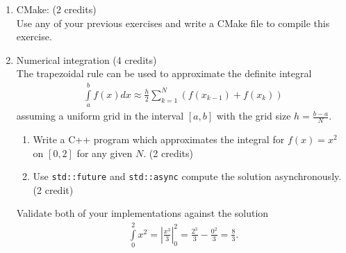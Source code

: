 \documentclass[11pt]{article}
\begin{document}
\begin{enumerate}

\item CMake: (2 credits)\\
Use any of your previous exercises and write a CMake file to compile this exercise.
\item Numerical integration (4 credits)\\
The trapezoidal rule can be used to approximate the definite integral 
\begin{align*}
\int\limits_a^b f(x) dx \approx \frac{h}{2} \sum\limits_{k=1}^N (f(x_{k-1}) + f(x_k))
\end{align*}
assuming a uniform grid in the interval $[a,b]$ with the grid size $h=\frac{b-a}{N}$.
\begin{enumerate}
\item Write a C++ program which approximates the integral for $f(x)=x^2$ on $[0,2]$ for any given $N$. (2 credits)
\item Use \lstinline|std::future| and \lstinline|std::async| compute the solution asynchronously. (2 credit)
\end{enumerate}
Validate both of your implementations against the solution 
\begin{align*}
\int\limits_0^2 x^2 = \left\vert \frac{x^3}{3}\right\vert_0^2 = \frac{2^3}{3} - \frac{0^2}{3} = \frac{8}{3}\text{.}
\end{align*}

\end{enumerate}

\doclicenseThis 
\end{document}
